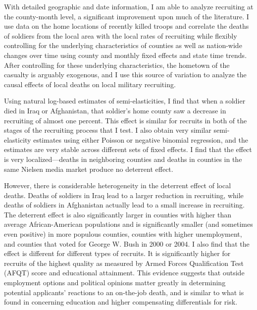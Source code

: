 \documentclass[12pt] {article}
\begin{document}
With detailed geographic and date information, I am able to analyze recruiting at the county-month
level, a significant improvement upon much of the literature. I use data on the home locations of recently killed troops and correlate the deaths of soldiers from the local area with the local rates of recruiting while flexibly controlling for the underlying characteristics of counties as well as nation-wide changes over time using county and monthly fixed effects and state time trends. After controlling for these underlying characteristics, the hometown of the casualty is arguably exogenous, and I use this source of variation to analyze the causal effects of local deaths on local military recruiting. 

Using natural log-based estimates of semi-elasticities, I
find that when a soldier died in Iraq or Afghanistan, that soldier's
home county saw a decrease in recruiting of almost one percent. This
effect is similar for recruits in both of the stages of the recruiting
process that I test. I also obtain very similar semi-elasticity estimates
using either Poisson or negative binomial regression, and the estimates are very stable across different sets of fixed effects. I find that the effect is very localized---deaths
in neighboring counties and deaths in counties in the same Nielsen media market
produce no deterrent effect. 

However, there is considerable heterogeneity in the deterrent effect of local deaths. Deaths of soldiers in Iraq lead to a larger reduction in recruiting, while deaths of soldiers in Afghanistan actually lead to a small increase in recruiting. The deterrent effect is also significantly larger in counties with higher than average African-American populations and is significantly smaller (and sometimes even positive) in more populous counties, counties with higher unemployment, and counties that voted for George W. Bush in 2000 or 2004. I also find that the effect is different for different types of recruits. %
It is significantly higher for recruits of the highest quality as measured by Armed Forces Qualification Test (AFQT) score and educational attainment. This evidence suggests that outside employment options and political opinions matter greatly in determining potential applicants' reactions to an on-the-job death, and is similar to what is found in \cite{kahn1987occupational} concerning education and higher compensating differentials for risk.
\end{document}
